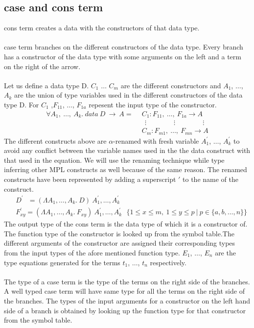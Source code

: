 \documentclass[11pt]{article}
\begin{document}
\subsection {case and cons term}
{\sf cons } term creates a data with the constructors of that data type.
~~\\~~\\
{\sf case} term branches on the different constructors of the data type. Every branch has a constructor of the data type with some arguments on the left and a term on the right of the arrow. 
~~\\~~\\
Let us define a data type D. $C_1$ $\ldots$ $C_m$ are the different constructors and $A_1$, $\ldots$, $A_k$ are the union of type variables used in the different constructors of the data type D. For $C_1$ ,$F_{11}$, $\ldots$, $F_{1a}$ repesent the input type of the constructor.
\begin{align*} 
\forall A_1,~ \ldots,~A_k.~data~ D ~\to~ A =
 & ~~ C_1 : F_{11},~ \ldots, ~ F_{1a} \to A \\
 & ~~~~ \vdots \qquad\qquad \vdots \qquad\qquad \vdots \\ 
 & ~~ C_m : F_{m1} ,~ \ldots, ~ F_{mn} \to A
\end{align*}
The different constructs above are $\alpha$-renamed with fresh variable $A_1^{\prime}$, $\ldots$, $A_k^{\prime}$ to avoid any conflict between the variable names used in the the data construct with that used in the equation. We will use the renaming technique while type inferring other MPL constructs as well because of the same reason.  The renamed constructs have been represented by adding a superscript $\prime$ to the name of the construct.
\begin{align*}
 & ~~ D^\prime ~~~ = (\Lambda A_1,\ldots,A_k.~ D)~A_1^{\prime},\ldots,A_k^{\prime}\\ 
 & ~~ F_{xy}^\prime = (\Lambda A_1,\ldots,A_k.~F_{xy})~A_1^{\prime},\ldots,A_k^{\prime} 
 ~~~  \{1 \leq x \leq m,~1 \leq y \leq p ~|~ p \in \{a,b,\ldots,n\} \} 
 \end{align*}
The output type of the {\sf cons} term is the data type of which it is a constructor of. The function type of the constructor is looked up from the symbol table.The different arguments of the constructor are assigned their corresponding types from the input types of the afore mentioned function type. $E_1$, $\ldots$, $E_n$ are the type equations generated for the terms $t_1$, $\ldots$, $t_n$ respectively.
~~\\~~\\
The type of a {\sf case} term is the type of the terms on the right side of the branches. A well typed case term will have same type for all the terms on the right side of the branches. The types of the input arguments for a constructor on the left hand side of a branch is obtained by looking up the function type for that constructor from the symbol table. 
\end{document}
